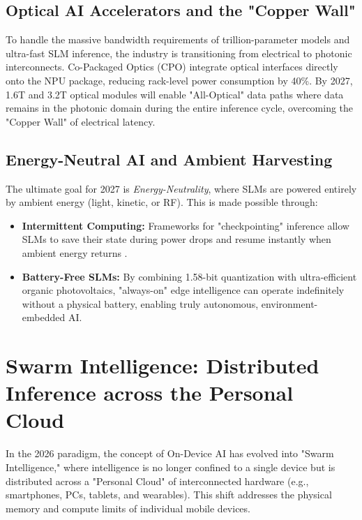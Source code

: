 \documentclass[twocolumn,10pt]{article}
\begin{document}
\subsection{Optical AI Accelerators and the "Copper Wall"}
To handle the massive bandwidth requirements of trillion-parameter models and ultra-fast SLM inference, the industry is transitioning from electrical to photonic interconnects. Co-Packaged Optics (CPO) \cite{cpo2027} integrate optical interfaces directly onto the NPU package, reducing rack-level power consumption by 40\%. By 2027, 1.6T and 3.2T optical modules will enable "All-Optical" data paths where data remains in the photonic domain during the entire inference cycle, overcoming the "Copper Wall" of electrical latency.

\subsection{Energy-Neutral AI and Ambient Harvesting}
The ultimate goal for 2027 is \textit{Energy-Neutrality}, where SLMs are powered entirely by ambient energy (light, kinetic, or RF). This is made possible through:
\begin{itemize}
    \item \textbf{Intermittent Computing:} Frameworks for "checkpointing" inference allow SLMs to save their state during power drops and resume instantly when ambient energy returns \cite{intermittent2026}.
    \item \textbf{Battery-Free SLMs:} By combining 1.58-bit quantization with ultra-efficient organic photovoltaics, "always-on" edge intelligence can operate indefinitely without a physical battery, enabling truly autonomous, environment-embedded AI.
\end{itemize}

\section{Swarm Intelligence: Distributed Inference across the Personal Cloud}
In the 2026 paradigm, the concept of On-Device AI has evolved into "Swarm Intelligence," where intelligence is no longer confined to a single device but is distributed across a "Personal Cloud" of interconnected hardware (e.g., smartphones, PCs, tablets, and wearables). This shift addresses the physical memory and compute limits of individual mobile devices.
\end{document}
